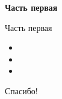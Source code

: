 \documentclass{beamer}
\begin{document}
\begin{frame}{}
\begin{center}
	\textbf{Часть первая}
\end{center}
\end{frame}

\begin{frame}{Часть первая}
\begin{itemize}
	\item 
	\medskip
	\item 
	\medskip
	\item  
\end{itemize}
\end{frame}




\begin{frame}{}
    \thispagestyle{empty}
    \begin{center}
        {\large Спасибо!}
    \end{center}
\end{frame}
\end{document}
